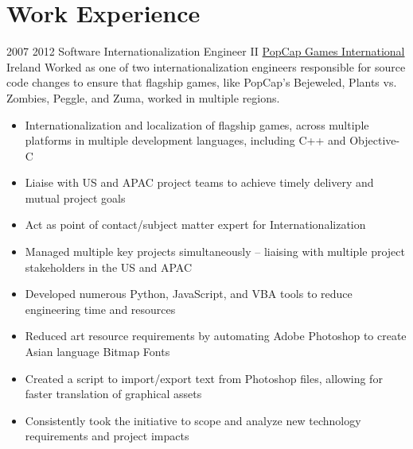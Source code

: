 \documentclass[a4paper]{twentysecondcv} %
\begin{document}
\newpage
\makeprofiletwo

\section{Work Experience}
\begin{twenty}
\twentyitem
    	{2007} %
	{2012} %
    {Software Internationalization Engineer II} %
    {\href{https://www.popcap.com/}{PopCap Games International}} %
    {Ireland} %
    {Worked as one of two internationalization engineers responsible for source code changes to ensure that flagship games, like PopCap's Bejeweled, Plants vs. Zombies, Peggle, and Zuma, worked in multiple regions.} %
	{\begin{itemize}
		\item Internationalization and localization of flagship games, across multiple platforms in multiple development languages, including C++ and Objective-C
		\item Liaise with US and APAC project teams to achieve timely delivery and mutual project goals
		\item Act as point of contact/subject matter expert for Internationalization
	\end{itemize}
	} %
	{\begin{itemize}
		\item Managed multiple key projects simultaneously – liaising with multiple project stakeholders in the US and APAC
		\item Developed numerous Python, JavaScript, and VBA tools to reduce engineering time and resources
		\item Reduced art resource requirements by automating Adobe Photoshop to create Asian language Bitmap Fonts
		\item Created a script to import/export text from Photoshop files, allowing for faster translation of graphical assets
		\item Consistently took the initiative to scope and analyze new technology requirements and project impacts
	\end{itemize}
	} %

\end{twenty}

\vspace{0.75\baselineskip}%
\end{document}

